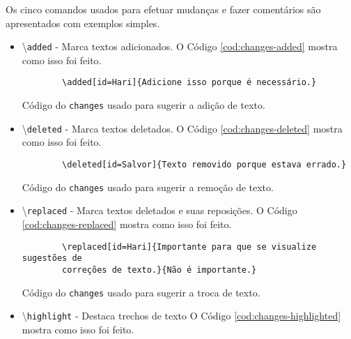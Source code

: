 Os cinco comandos usados para efetuar mudanças e fazer comentários são apresentados com exemplos simples.
\begin{itemize}
	\item \textbackslash \texttt{added} - Marca textos adicionados.  O Código \ref{cod:changes-added} mostra como isso foi feito.
	\begin{listing}[ht]
		\begin{verbatim}
		\added[id=Hari]{Adicione isso porque é necessário.}
		\end{verbatim}
		\caption{Código do \texttt{changes} usado para sugerir a adição de texto.}
		\label{cod:changes-added}
	\end{listing}

	\item \textbackslash \texttt{deleted} - Marca textos deletados.  O Código \ref{cod:changes-deleted} mostra como isso foi feito.
	
	\begin{listing}[ht]
		\begin{verbatim}
		\deleted[id=Salvor]{Texto removido porque estava errado.}
		\end{verbatim}
		\caption{Código do \texttt{changes} usado para sugerir a remoção de texto.}
		\label{cod:changes-deleted}
    \end{listing}

	\item \textbackslash \texttt{replaced} - Marca textos deletados e suas reposições.  O Código \ref{cod:changes-replaced} mostra como isso foi feito.
	
	\begin{listing}[ht]
		\begin{verbatim}
		\replaced[id=Hari]{Importante para que se visualize sugestões de 
		correções de texto.}{Não é importante.}
		\end{verbatim}
		\caption{Código do \texttt{changes} usado para sugerir a troca de texto.}
		\label{cod:changes-replaced}
	\end{listing}

	\item \textbackslash \texttt{highlight} - Destaca trechos de texto  O Código \ref{cod:changes-highlighted} mostra como isso foi feito.
	

\end{itemize}
